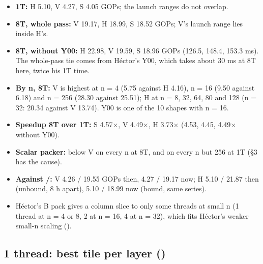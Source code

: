 \begin{itemize}\setlength\itemsep{1pt}
\item \textbf{1T:} H 5.10, V 4.27, S 4.05 GOPs; the launch ranges do not overlap.
\item \textbf{8T, whole pass:} V 19.17, H 18.99, S 18.52 GOPs; V's launch range lies inside H's.
\item \textbf{8T, without Y00:} H 22.98, V 19.59, S 18.96 GOPs (126.5, 148.4, 153.3 ms). The whole-pass tie comes from H\'ector's Y00, which takes about 30 ms at 8T here, twice his 1T time.
\item \textbf{By n, 8T:} V is highest at n = 4 (5.75 against H 4.16), n = 16 (9.50 against 6.18) and n = 256 (28.30 against 25.51); H at n = 8, 32, 64, 80 and 128 (n = 32: 20.34 against V 13.74). Y00 is one of the 10 shapes with n = 16.
\item \textbf{Speedup 8T over 1T:} S 4.57$\times$, V 4.49$\times$, H 3.73$\times$ (4.53, 4.45, 4.49$\times$ without Y00).
\item \textbf{Scalar packer:} below V on every n at 8T, and on every n but 256 at 1T (\S3 has the cause).
\item \textbf{Against /:} V 4.26 / 19.55 GOPs then, 4.27 / 19.17 now; H 5.10 / 21.87 then (unbound, 8 h apart), 5.10 / 18.99 now (bound, same series).
\item H\'ector's B pack gives a column slice to only some threads at small n (1 thread at n = 4 or 8, 2 at n = 16, 4 at n = 32), which fits H\'ector's weaker small-n scaling ().
\end{itemize}

\subsection{1 thread: best tile per layer ()}\label{sec:1t}


